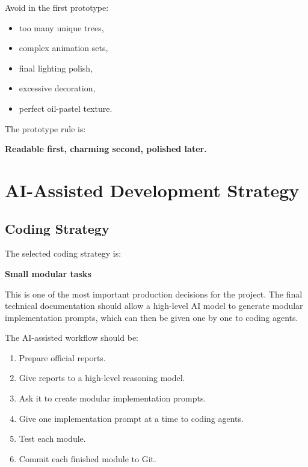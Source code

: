 \documentclass[12pt]{article}
\begin{document}
Avoid in the first prototype:

\begin{itemize}[leftmargin=*]
    \item too many unique trees,
    \item complex animation sets,
    \item final lighting polish,
    \item excessive decoration,
    \item perfect oil-pastel texture.
\end{itemize}

The prototype rule is:

\begin{center}
\textbf{Readable first, charming second, polished later.}
\end{center}

\section{AI-Assisted Development Strategy}

\subsection{Coding Strategy}

The selected coding strategy is:

\begin{center}
\textbf{Small modular tasks}
\end{center}

This is one of the most important production decisions for the project. The final technical documentation should allow a high-level AI model to generate modular implementation prompts, which can then be given one by one to coding agents.

The AI-assisted workflow should be:

\begin{enumerate}[leftmargin=*]
    \item Prepare official reports.
    \item Give reports to a high-level reasoning model.
    \item Ask it to create modular implementation prompts.
    \item Give one implementation prompt at a time to coding agents.
    \item Test each module.
    \item Commit each finished module to Git.
\end{enumerate}
\end{document}
